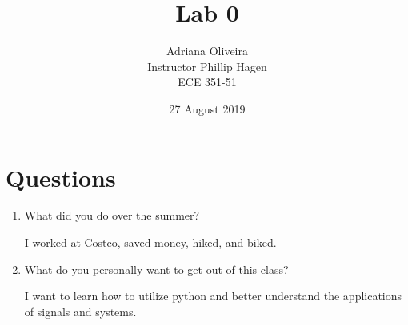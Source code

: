 \documentclass{article}
\title{Lab 0}
\author{Adriana Oliveira\\Instructor Phillip Hagen\\ECE 351-51}
\date{27 August 2019}
\begin{document}
\vspace{\fill}
\maketitle
\vspace{\fill}
\clearpage

\section*{Questions}

\begin{enumerate}
  \item What did you do over the summer?
  
  \begin{flushleft}
  I worked at Costco, saved money, hiked, and biked.  
  \end{flushleft}
  
  \item What do you personally want to get out of this class?
  
  \begin{flushleft}
  I want to learn how to utilize python and better understand the applications of signals and systems. 
  \end{flushleft}
  
\end{enumerate}
\end{document}
